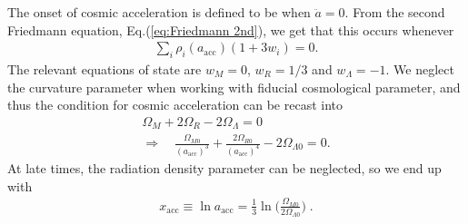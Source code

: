 \documentclass[twocolumn]{aa}
\begin{document}
\begin{appendix}
The onset of cosmic acceleration is defined to be when $\ddot{a}=0$. From the second Friedmann equation, Eq.(\ref{eq:Friedmann 2nd}), we get that this occurs whenever
\begin{align*}
      \sum_i \rho_i(a_\text{acc})(1+3w_i) = 0.
\end{align*}
The relevant equations of state are $w_M = 0$, $w_R = 1/3$ and $w_\Lambda = -1$. We neglect the curvature parameter when working with fiducial cosmological parameter, and thus the condition for cosmic acceleration can be recast into 
\begin{align*}
      \Omega_M + 2\Omega_R -2\Omega_\Lambda =0\\
      \Rightarrow\quad \frac{\Omega_{M0}}{(a_\text{acc})^3} + \frac{2\Omega_{R0}}{(a_\text{acc})^4}-2\Omega_{\Lambda0} = 0.
\end{align*}
At late times, the radiation density parameter can be neglected, so we end up with
\begin{align*}
      x_\text{acc} \equiv \ln a_\text{acc} = \frac{1}{3}\ln\bigg(\frac{\Omega_{M0}}{2\Omega_{\Lambda 0}}\bigg)\;.
\end{align*}

\end{appendix}
\end{document}
